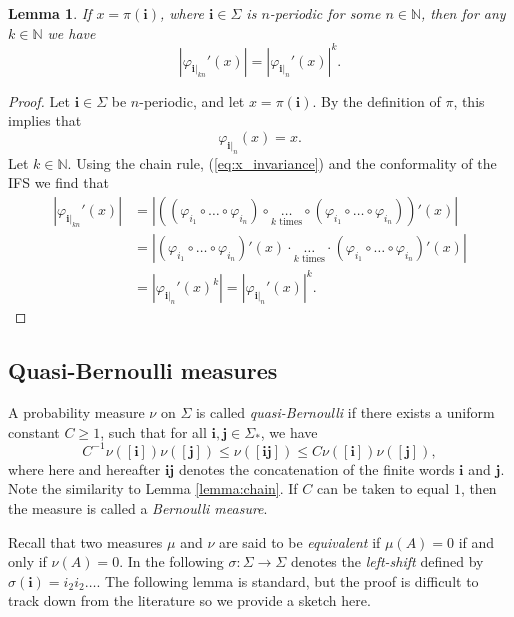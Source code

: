 \documentclass{PRM}
\newcommand{\field}[1]{\mathbb{#1}}
\newcommand{\N}{\field{N}}
\newcommand{\iii}{\mathbf{i}}
\theoremstyle{plain}
\newtheorem{lemma}[thm]{Lemma}
\theoremstyle{definition}
\theoremstyle{remark}
\begin{document}
\begin{lemma}\label{lemma:power_equality}
If $x= \pi(\mathbf{i})$, where $\mathbf{i}\in\Sigma$ is $n$-periodic for some $n\in\N$, then for any $k\in\N$ we have
\begin{equation*}
    |\varphi_{\mathbf{i}|_{kn}}'(x)|=|\varphi_{\mathbf{i}|_{n}}'(x)|^k.
\end{equation*}
\end{lemma}
\begin{proof}
Let $\mathbf{i}\in \Sigma$ be $n$-periodic, and let $x=\pi(\mathbf{i})$. By the definition of $\pi$, this implies that 
\begin{equation}\label{eq:x_invariance}
    \varphi_{\mathbf{i}|_n}(x)=x.
\end{equation}
Let $k\in\N$. Using the chain rule, (\ref{eq:x_invariance}) and the conformality of the IFS we find that
\begin{align*}
    |\varphi_{\mathbf{i}|_{kn}}'(x)|&=|((\varphi_{i_1}\circ\ldots\circ\varphi_{i_n})\circ\underset{k\text{ times}}{\ldots}\circ(\varphi_{i_1}\circ\ldots\circ\varphi_{i_n}))'(x)|\\
    &=|(\varphi_{i_1}\circ\ldots\circ \varphi_{i_n})'(x)\cdot\underset{k\text{ times}}{\ldots}\cdot(\varphi_{i_1}\circ\ldots\circ \varphi_{i_n})'(x)|\\
    &=|\varphi_{\mathbf{i}|_n}'(x)^k|=|\varphi_{\mathbf{i}|_n}'(x)|^k.
\end{align*}
\end{proof}

\subsection{Quasi-Bernoulli measures}
A probability measure $\nu$ on $\Sigma$ is called \emph{quasi-Bernoulli} if there exists a uniform constant $C\geq 1$, such that for all $\mathbf{i},\mathbf{j}\in\Sigma_*$, we have
\begin{equation*}
    C^{-1}\nu([\mathbf{i}])\nu([\mathbf{j}])\leq \nu([\mathbf{i}\mathbf{j}])\leq C\nu([\mathbf{i}])\nu([\mathbf{j}]),
\end{equation*}
where here and hereafter $\mathbf{i}\mathbf{j}$ denotes the concatenation of the finite words $\mathbf{i}$ and $\mathbf{j}$. Note the similarity to Lemma \ref{lemma:chain}. If $C$ can be taken to equal $1$, then the measure is called a \emph{Bernoulli measure}.

Recall that two measures $\mu$ and $\nu$ are said to be \emph{equivalent} if $\mu(A)=0$ if and only if $\nu(A)=0$. In the following $\sigma\colon \Sigma\to\Sigma$ denotes the \emph{left-shift} defined by $\sigma(\iii)=i_2i_2\ldots$. The following lemma is standard, but the proof is difficult to track down from the literature so we provide a sketch here.
\end{document}
